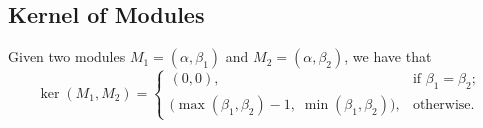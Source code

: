 \documentclass{article}
\begin{document}
\subsection*{Kernel of Modules}
Given two modules $M_1 = (\alpha,\beta_1)$ and $M_2 = (\alpha,\beta_2)$, we have that 
\[
   \ker(M_1,M_2) = 
   \begin{cases}
      (0,0), & \text{if } \beta_1 = \beta_2; \\
      \big(\max(\beta_1,\beta_2) - 1, \; \min(\beta_1, \beta_2)\big), & \text{otherwise.}
   \end{cases}
\]
\fi
\end{document}
